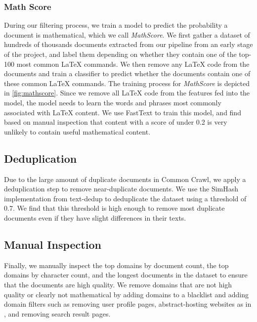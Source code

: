 \subsubsection{Math Score}
\label{sec:math_score}

During our filtering process, we train a model to predict the probability a document is mathematical, which we call \textit{MathScore}. We first gather a dataset of hundreds of thousands documents extracted from our pipeline from an early stage of the project, and label them depending on whether they contain one of the top-100 most common \LaTeX{} commands. We then remove any \LaTeX{} code from the documents and train a classifier to predict whether the documents contain one of these common \LaTeX{} commands. The training process for \textit{MathScore} is depicted in \autoref{fig:mathscore}. Since we remove all \LaTeX{} code from the features fed into the model, the model needs to learn the words and phrases most commonly associated with \LaTeX{} content. We use FastText \citep{joulin2016fasttext} to train this model, and find based on manual inspection that content with a score of under 0.2 is very unlikely to contain useful mathematical content.

\subsection{Deduplication}

Due to the large amount of duplicate documents in Common Crawl, we apply a deduplication step to remove near-duplicate documents. We use the SimHash implementation from text-dedup \citep{text-dedup} to deduplicate the dataset using a threshold of 0.7. We find that this threshold is high enough to remove most duplicate documents even if they have slight differences in their texts.

\subsection{Manual Inspection}

Finally, we manually inspect the top domains by document count, the top domains by character count, and the longest documents in the dataset to ensure that the documents are high quality. We remove domains that are not high quality or clearly not mathematical by adding domains to a blacklist and adding domain filters such as removing user profile pages, abstract-hosting websites as in \citet{lewkowycz2022solving}, and removing search result pages.